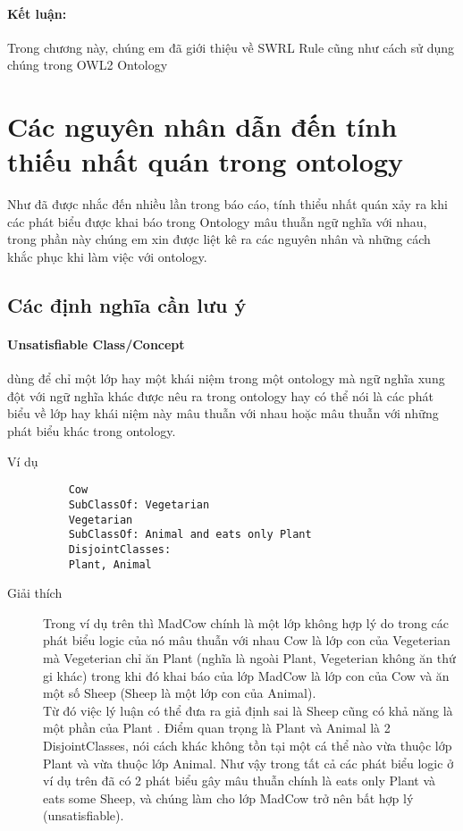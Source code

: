 \paragraph{Kết luận:} Trong chương này, chúng em đã giới thiệu về SWRL Rule cũng như cách sử dụng chúng trong OWL2 Ontology 


\section{Các nguyên nhân dẫn đến tính thiếu nhất quán trong ontology}
Như đã được nhắc đến nhiều lần trong báo cáo, tính thiểu nhất quán xảy ra khi các phát biểu được khai báo trong Ontology mâu thuẫn ngữ nghĩa với nhau, trong phần này chúng em xin được liệt kê ra các nguyên nhân và những cách khắc phục khi làm việc với ontology.
\subsection{Các định nghĩa cần lưu ý \cite{satisfy}}
\paragraph{Unsatisfiable Class/Concept} dùng để chỉ một lớp hay một khái niệm trong một ontology mà ngữ nghĩa xung đột với ngữ nghĩa khác được nêu ra trong ontology hay có thể nói là các phát biểu về lớp hay khái niệm này mâu thuẫn với nhau hoặc mâu thuẫn với những phát biểu khác trong ontology.
\begin{description}
	\item[Ví dụ]
	\begin{verbatim}
	Cow
	SubClassOf: Vegetarian
	Vegetarian
	SubClassOf: Animal and eats only Plant
	DisjointClasses:
	Plant, Animal
	\end{verbatim}
	\item[Giải thích]
	Trong ví dụ trên thì MadCow chính là một lớp không hợp lý do trong các phát biểu logic của nó mâu thuẫn với nhau Cow là lớp con của Vegeterian mà Vegeterian chỉ ăn Plant (nghĩa là ngoài Plant, Vegeterian không ăn thứ gi khác) trong khi đó khai báo của lớp MadCow là lớp con của Cow và ăn một số Sheep (Sheep là một lớp con của Animal).
	\\
	Từ đó việc lý luận có thể đưa ra giả định sai là Sheep cũng có khả năng là một phần của Plant . Điểm quan trọng là Plant và Animal là 2 DisjointClasses, nói cách khác không tồn tại một cá thể nào vừa thuộc lớp Plant và vừa thuộc lớp Animal. Như vậy trong tất cả các phát biểu logic ở ví dụ trên đã có 2 phát biểu gây mâu thuẫn chính là eats only Plant và eats some Sheep, và chúng làm cho lớp MadCow trở nên bất hợp lý (unsatisfiable).
\end{description}
